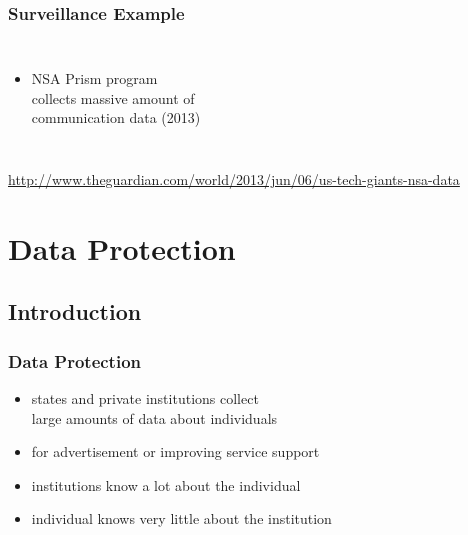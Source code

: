 \documentclass[dvipsnames]{beamer}
\theoremstyle{plain}
\begin{document}
\begin{frame}
  \frametitle{Surveillance Example}

  \begin{columns}

    \begin{itemize}
      \item NSA Prism program\\
        collects massive amount of\\
        communication data (2013)
    \end{itemize}
  \end{columns}

  \medskip
  \tiny{\url{http://www.theguardian.com/world/2013/jun/06/us-tech-giants-nsa-data}}\\
\end{frame}

\section{Data Protection}

\subsection{Introduction}

\begin{frame}
  \frametitle{Data Protection}

  \begin{itemize}
    \item states and private institutions collect\\
      large amounts of data about individuals
    \item for advertisement or improving service support

    \bigskip
    \item institutions know a lot about the individual
    \item individual knows very little about the institution
  \end{itemize}
\end{frame}
\end{document}
